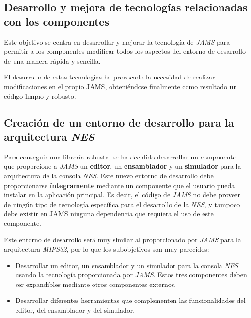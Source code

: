 \subsection{Desarrollo y mejora de tecnologías relacionadas con los componentes}
\label{subsec:desarrollo-y-mejora-de-tecnologias-relacionadas-con-los-componentes}

Este objetivo se centra en desarrollar y mejorar la tecnología de \textit{JAMS}
para permitir a los componentes modificar todos los aspectos del entorno de
desarrollo de una manera rápida y sencilla.

El desarrollo de estas tecnologías ha provocado la necesidad de
realizar modificaciones en el propio JAMS,
obteniéndose finalmente como resultado un código limpio y robusto.

\subsection{Creación de un entorno de desarrollo para la arquitectura \textit{NES}}
\label{subsec:creacion-de-un-entorno-de-desarrollo-para-la-arquitectura-mips32}

Para conseguir una librería robusta, se ha decidido desarrollar un componente
que proporcione a \textit{JAMS} un \textbf{editor}, un
\textbf{ensamblador} y un \textbf{simulador}
para la arquitectura de la consola \textit{NES}.
Este nuevo entorno de desarrollo debe proporcionarse \textbf{íntegramente}
mediante un componente que el usuario pueda instalar en la aplicación
principal.
Es decir, el código de \textit{JAMS} no debe proveer de ningún
tipo de tecnología específica para el desarrollo de la \textit{NES},
y tampoco debe existir en JAMS ninguna dependencia que requiera el uso de este componente.

Este entorno de desarrollo será muy similar al proporcionado
por \textit{JAMS} para la arquitectura \textit{MIPS32}, por lo que los
subobjetivos son muy parecidos:

\begin{itemize}
    \item Desarrollar un editor, un ensamblador y un simulador
    para la consola \textit{NES} usando la tecnología
    proporcionada por \textit{JAMS}.
    Estos tres componentes deben ser expandibles mediante otros componentes externos.
    \item Desarrollar diferentes herramientas que complementen las funcionalidades
    del editor, del ensamblador y del simulador.
\end{itemize}


